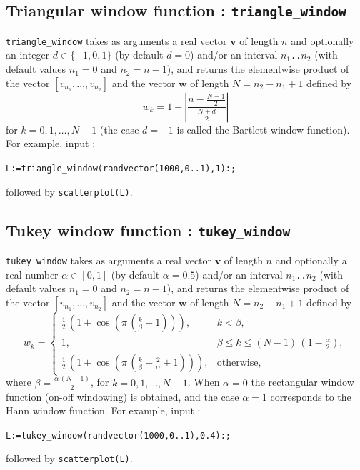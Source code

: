\documentclass[a4paper,11pt]{book}
\begin{document}
\subsection{Triangular window function : {\tt triangle\_window}}
{\tt triangle\_window} takes as arguments a real vector $ \mathbf{v} $ of length $ n $ and optionally an integer $ d\in\{-1,0,1\} $ (by default $ d=0 $) and/or an interval $ n_1 ${\tt ..}$ n_2 $ (with default values $ n_1=0 $ and $ n_2=n-1 $), and returns the elementwise product of the vector $ [v_{n_1},\dots,v_{n_2}] $ and the vector $ \mathbf{w} $ of length $ N=n_2-n_1+1 $ defined by
\[ w_k=1-\left|\frac{n-\frac{N-1}{2}}{\frac{N+d}{2}}\right| \]
for $ k=0,1,\dots,N-1 $ (the case $ d=-1 $ is called the Bartlett window function). For example, input :
\begin{center}
	{\tt L:=triangle\_window(randvector(1000,0..1),1):;}
\end{center}
followed by {\tt scatterplot(L)}.

\subsection{Tukey window function : {\tt tukey\_window}}
{\tt tukey\_window} takes as arguments a real vector $ \mathbf{v} $ of length $ n $ and optionally a real number $ \alpha\in[0,1] $ (by default $ \alpha=0.5 $) and/or an interval $ n_1 ${\tt ..}$ n_2 $ (with default values $ n_1=0 $ and $ n_2=n-1 $), and returns the elementwise product of the vector $ [v_{n_1},\dots,v_{n_2}] $ and the vector $ \mathbf{w} $ of length $ N=n_2-n_1+1 $ defined by
\[ w_k=\begin{cases}
\frac{1}{2}\,\left(1+\cos\left(\pi\,\left(\frac{k}{\beta}-1\right)\right)\right),&k<\beta,\\
1,&\beta\leq k\leq(N-1)\,\left(1-\frac{\alpha}{2}\right),\\
\frac{1}{2}\,\left(1+\cos\left(\pi\,\left(\frac{k}{\beta}-\frac{2}{\alpha}+1\right)\right)\right),&\text{otherwise},
\end{cases} \]
where $ \beta=\frac{\alpha\,(N-1)}{2} $, for $ k=0,1,\dots,N-1 $. When $ \alpha=0 $ the rectangular window function (on-off windowing) is obtained, and the case $ \alpha=1 $ corresponds to the Hann window function. For example, input :
\begin{center}
	{\tt L:=tukey\_window(randvector(1000,0..1),0.4):;}
\end{center}
followed by {\tt scatterplot(L)}.
\end{document}
